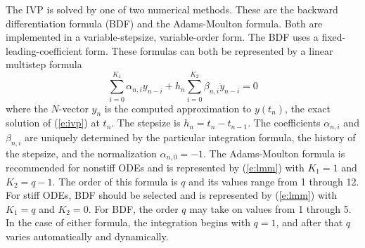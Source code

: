 The IVP is solved by one of two numerical methods. These are the
backward differentiation formula (BDF) and the Adams-Moulton formula. 
Both are implemented in a variable-stepsize, variable-order form. The BDF
uses a fixed-leading-coefficient form. These formulas can both be
represented by a linear multistep formula 
\begin{equation}\label{e:lmm}
\sum_{i=0}^{K_1}\alpha_{n,i}y_{n-i} + h_n\sum_{i=0}^{K_2}\beta_{n,i} 
\dot{y}_{n-i}=0
\end{equation}
where the $N$-vector $y_n$ is the computed approximation to $y(t_n)$,
the exact solution of (\ref{e:ivp}) at $t_n$. The stepsize is
$h_n=t_n-t_{n-1}$.  The coefficients $\alpha_{n,i}$ and $\beta_{n,i}$
are uniquely determined by the particular integration formula, the
history of the stepsize, and the normalization $\alpha_{n,0}=-1$. The
Adams-Moulton formula is recommended for nonstiff ODEs and is
represented by (\ref{e:lmm}) with $K_1=1$ and $K_2=q-1$. The order
of this formula is $q$ and its values range from 1 through 12. For
stiff ODEs, BDF should be selected and is represented by 
(\ref{e:lmm}) with $K_1=q$ and $K_2=0$. For BDF, the order $q$ may
take on values from 1 through 5. In the case of either formula, the
integration begins with $q=1$, and after that $q$ varies automatically
and dynamically.

